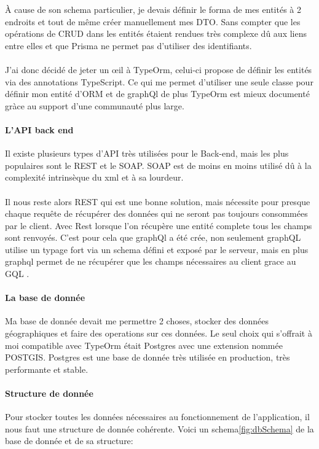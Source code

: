 À cause de son schema particulier, je devais définir le forma de mes entités à 2 endroits et tout de même créer manuellement mes DTO\@.
Sans compter que les opérations de CRUD dans les entités étaient rendues très complexe dû aux liens entre elles et que Prisma ne permet pas d'utiliser des identifiants.\\\\
J'ai donc décidé de jeter un œil à TypeOrm, celui-ci propose de définir les entités via des annotations TypeScript.
Ce qui me permet d'utiliser une seule classe pour définir mon entité d'ORM et de graphQl de plus TypeOrm est mieux
documenté gràce au support d'une communauté plus large.

\paragraph{L'API back end}
Il existe plusieurs types d'API très utilisées pour le Back-end, mais les plus populaires sont le REST et le SOAP\@.
SOAP est de moins en moins utilisé dû à la complexité intrinsèque du xml et à sa lourdeur.\\\\
Il nous reste alors REST qui est une bonne solution, mais nécessite pour presque chaque requête de récupérer des données qui ne seront pas toujours consommées par le client.
Avec Rest lorsque l'on récupère une entité complete tous les champs sont renvoyés.
C'est pour cela que graphQl a été crée, non seulement graphQL utilise un typage fort via un schema défini et exposé par le serveur,
mais en plus graphql permet de ne récupérer que les champs nécessaires au client grace au GQL .

\paragraph{La base de donnée}
Ma base de donnée devait me permettre 2 choses, stocker des données géographiques et faire des operations sur ces données.
Le seul choix qui s'offrait à moi compatible avec TypeOrm était Postgres avec une extension nommée POSTGIS\@.
Postgres est une base de donnée très utilisée en production, très performante et stable.

\paragraph{Structure de donnée}
Pour stocker toutes les données nécessaires au fonctionnement de l'application, il nous faut une structure de donnée cohérente.
Voici un schema\ref{fig:dbSchema} de la base de donnée et de sa structure:

